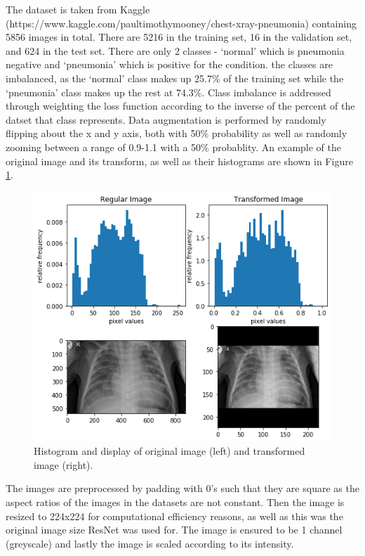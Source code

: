 \documentclass[10pt,twocolumn,letterpaper]{article}
\begin{document}
The dataset is taken from Kaggle (https://www.kaggle.com/paultimothymooney/chest-xray-pneumonia) containing 5856 images in total. There are 5216 in the training set, 16 in the validation set, and 624 in the test set. There are only 2 classes - `normal' which is pneumonia negative and `pneumonia' which is positive for the condition. the classes are imbalanced, as the `normal' class makes up 25.7\% of the training set while the `pneumonia' class makes up the rest at 74.3\%. Class imbalance is addressed through weighting the loss function according to the inverse of the percent of the datset that class represents. Data augmentation is performed by randomly flipping about the x and y axis, both with 50\% probability as well as randomly zooming between a range of 0.9-1.1 with a 50\% probablity. An example of the original image and its transform, as well as their histograms are shown in Figure \ref{fig:fig2}.

\begin{figure}[h]
\begin{center}
   \includegraphics[width=0.95\linewidth]{images/hist_and_transform1.png}
\end{center}
   \caption{Histogram and display of original image (left) and transformed image (right).}
\label{fig:fig2}
\end{figure}

The images are preprocessed by padding with 0's such that they are square as the aspect ratios of the images in the datasets are not constant. Then the image is resized to 224x224 for computational efficiency reasons, as well as this was the original image size ResNet was used for. The image is ensured to be 1 channel (greyscale) and lastly the image is scaled according to its intensity.
\end{document}
